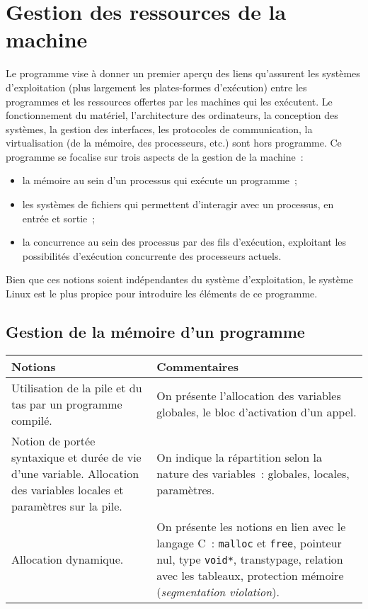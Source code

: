 \section{Gestion des ressources de la machine \semUn \semTroisQuatre}

Le programme vise à donner un premier aperçu des liens qu'assurent les systèmes
d'exploitation (plus largement les plates-formes d'exécution) entre les
programmes et les ressources offertes par les machines qui les exécutent. Le
fonctionnement du matériel, l'architecture des ordinateurs, la conception des
systèmes, la gestion des interfaces, les protocoles de communication, la
virtualisation (de la mémoire, des processeurs, etc.) sont hors programme. Ce
programme se focalise sur trois aspects de la gestion de la machine~:
\begin{itemize}
\item la mémoire au sein d'un processus qui exécute un programme~;
\item les systèmes de fichiers qui permettent d'interagir avec un processus, en
  entrée et sortie~;
\item la concurrence au sein des processus par des fils
  d'exécution, exploitant les possibilités d'exécution concurrente des
  processeurs actuels.
\end{itemize}
Bien que ces notions soient indépendantes du système d'exploitation, le système
Linux est le plus propice pour introduire les éléments de ce programme.

\subsection{Gestion de la mémoire d'un programme \semUn}
\noindent
\begin{longtable}{|p{\lnotion}|p{\comment}|}
  \hline
  \textbf{Notions} & \textbf{Commentaires}\\
  \hline \hline
  Utilisation de la pile et du tas par un programme compilé.
  &
  On présente l'allocation des variables globales, le bloc d'activation d'un
      appel. 
  \\
  \hline
  Notion de portée syntaxique et durée de vie d'une variable. Allocation des
  variables locales et paramètres sur la pile.
  &
  On indique la répartition selon la nature des variables~: globales, locales,
    paramètres.
  \\
  \hline
  Allocation dynamique.
  &
  On présente les notions en lien avec le langage C~: \texttt{malloc} et
    \texttt{free}, pointeur nul, type \texttt{void*}, transtypage, relation avec
    les tableaux, protection mémoire (\textit{segmentation violation}).
  \\
  \hline
\end{longtable}


